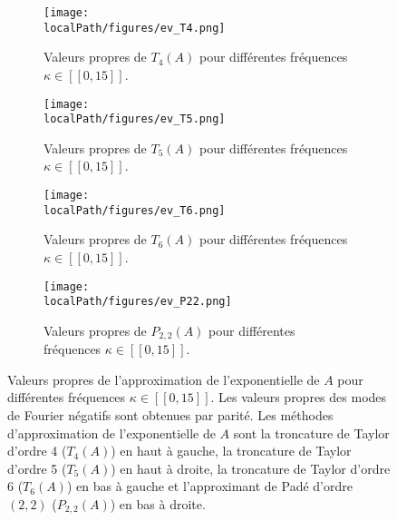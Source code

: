 \begin{figure}
  \begin{subfigure}{.5\textwidth}
    \centering
    \texttt{[image: \\localPath/figures/ev\_T4.png]}
    \caption{Valeurs propres de $T_4(A)$ pour différentes fréquences $\kappa\in[\![0,15]\!]$.}
    \label{fig:ev:T4}
  \end{subfigure}
  \begin{subfigure}{.5\textwidth}
    \centering
    \texttt{[image: \\localPath/figures/ev\_T5.png]}
    \caption{Valeurs propres de $T_5(A)$ pour différentes fréquences $\kappa\in[\![0,15]\!]$.}
    \label{fig:ev:T5}
  \end{subfigure}
  \begin{subfigure}{.5\textwidth}
    \centering
    \texttt{[image: \\localPath/figures/ev\_T6.png]}
    \caption{Valeurs propres de $T_6(A)$ pour différentes fréquences $\kappa\in[\![0,15]\!]$.}
    \label{fig:ev:T6}
  \end{subfigure}
  \begin{subfigure}{.5\textwidth}
    \texttt{[image: \\localPath/figures/ev\_P22.png]}
    \caption{Valeurs propres de $P_{2,2}(A)$ pour différentes fréquences $\kappa\in[\![0,15]\!]$.}
    \label{fig:ev:P22}
  \end{subfigure}
  \caption{Valeurs propres de l'approximation de l'exponentielle de $A$ pour différentes fréquences $\kappa\in[\![0,15]\!]$. Les valeurs propres des modes de Fourier négatifs sont obtenues par parité. Les méthodes d'approximation de l'exponentielle de $A$ sont la troncature de Taylor d'ordre 4 ($T_4(A)$) en haut à gauche, la troncature de Taylor d'ordre 5 ($T_5(A)$) en haut à droite, la troncature de Taylor d'ordre 6 ($T_6(A)$) en bas à gauche et l'approximant de Padé d'ordre $(2,2)$ ($P_{2,2}(A)$) en bas à droite.}
\end{figure}




